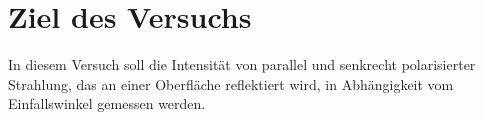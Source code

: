 \section{Ziel des Versuchs}
In diesem Versuch soll die Intensität von parallel und senkrecht polarisierter Strahlung, das an einer Oberfläche reflektiert wird, in Abhängigkeit vom Einfallswinkel gemessen werden.

